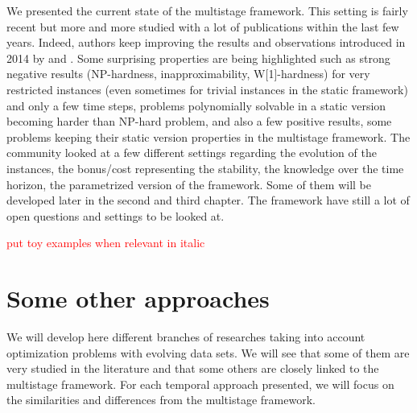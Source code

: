 \documentclass[a4paper]{book}
\newcommand{\alex}[2]{\textcolor{red}{#1}}
\begin{document}
We presented the current state of the multistage framework. This setting is fairly recent but more and more studied with a lot of publications within the last few years. Indeed, authors keep improving the results and observations introduced in 2014 by \cite{Gupta} and \cite{Eisenstat}. Some surprising properties are being highlighted such as strong negative results (NP-hardness, inapproximability, W[1]-hardness) for very restricted instances (even sometimes for trivial instances in the static framework) and only a few time steps, problems polynomially solvable in a static version becoming harder than NP-hard problem, and also a few positive results, some problems keeping their static version properties in the multistage framework. The community looked at a few different settings regarding the evolution of the instances, the bonus/cost representing the stability, the knowledge over the time horizon, the parametrized version of the framework. Some of them will be developed later in the second and third chapter. The framework have still a lot of open questions and settings to be looked at. 


\alex{put toy examples when relevant in italic}\\

\section{Some other approaches}

We will develop here different branches of researches taking into account optimization problems with evolving data sets. We will see that some of them are very studied in the literature and that some others are closely linked to the multistage framework. For each temporal approach presented, we will focus on the similarities and differences from the multistage framework.
\end{document}
